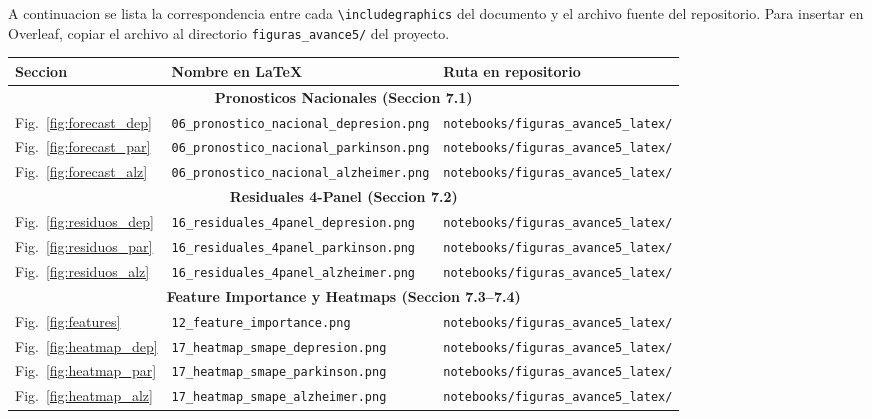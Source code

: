 \documentclass[12pt, letterpaper]{article}
\begin{document}
{\small
A continuacion se lista la correspondencia entre cada \texttt{\textbackslash includegraphics} del documento y el archivo fuente del repositorio. Para insertar en Overleaf, copiar el archivo al directorio \texttt{figuras\_avance5/} del proyecto.

\vspace{0.3cm}

\begin{longtable}{p{3.5cm} p{5cm} p{6.5cm}}
\toprule
\textbf{Seccion} & \textbf{Nombre en LaTeX} & \textbf{Ruta en repositorio} \\
\midrule
\endhead
\multicolumn{3}{c}{\textbf{Pronosticos Nacionales (Seccion 7.1)}} \\
\midrule
Fig.~\ref{fig:forecast_dep} & \texttt{06\_pronostico\_nacional\_depresion.png} & \texttt{notebooks/figuras\_avance5\_latex/} \\
Fig.~\ref{fig:forecast_par} & \texttt{06\_pronostico\_nacional\_parkinson.png} & \texttt{notebooks/figuras\_avance5\_latex/} \\
Fig.~\ref{fig:forecast_alz} & \texttt{06\_pronostico\_nacional\_alzheimer.png} & \texttt{notebooks/figuras\_avance5\_latex/} \\
\midrule
\multicolumn{3}{c}{\textbf{Residuales 4-Panel (Seccion 7.2)}} \\
\midrule
Fig.~\ref{fig:residuos_dep} & \texttt{16\_residuales\_4panel\_depresion.png} & \texttt{notebooks/figuras\_avance5\_latex/} \\
Fig.~\ref{fig:residuos_par} & \texttt{16\_residuales\_4panel\_parkinson.png} & \texttt{notebooks/figuras\_avance5\_latex/} \\
Fig.~\ref{fig:residuos_alz} & \texttt{16\_residuales\_4panel\_alzheimer.png} & \texttt{notebooks/figuras\_avance5\_latex/} \\
\midrule
\multicolumn{3}{c}{\textbf{Feature Importance y Heatmaps (Seccion 7.3--7.4)}} \\
\midrule
Fig.~\ref{fig:features} & \texttt{12\_feature\_importance.png} & \texttt{notebooks/figuras\_avance5\_latex/} \\
Fig.~\ref{fig:heatmap_dep} & \texttt{17\_heatmap\_smape\_depresion.png} & \texttt{notebooks/figuras\_avance5\_latex/} \\
Fig.~\ref{fig:heatmap_par} & \texttt{17\_heatmap\_smape\_parkinson.png} & \texttt{notebooks/figuras\_avance5\_latex/} \\
Fig.~\ref{fig:heatmap_alz} & \texttt{17\_heatmap\_smape\_alzheimer.png} & \texttt{notebooks/figuras\_avance5\_latex/} \\

\end{longtable}}
\end{document}
